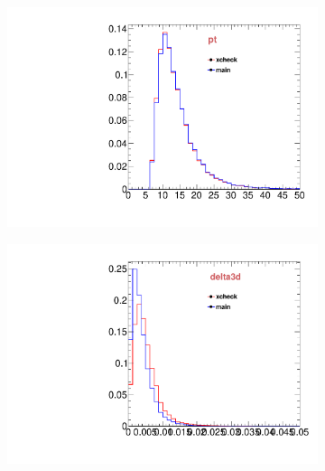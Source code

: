 \begin{figure}
\begin{subfigure}[b]{0.2\textwidth}
                \includegraphics[width=\textwidth]{Figures/VariablesComparison/MC_endcaps_figs/pt}
                \label{fig:MC_endcaps_pt}
        \end{subfigure}
        \begin{subfigure}[b]{0.2\textwidth}
                \centering
                \includegraphics[width=\textwidth]{Figures/VariablesComparison/MC_endcaps_figs/pvip}
                \label{fig:MC_endcaps_pvip}
        \end{subfigure}
        \begin{subfigure}[b]{0.2\textwidth}
                \centering

\end{subfigure}
\end{figure}
